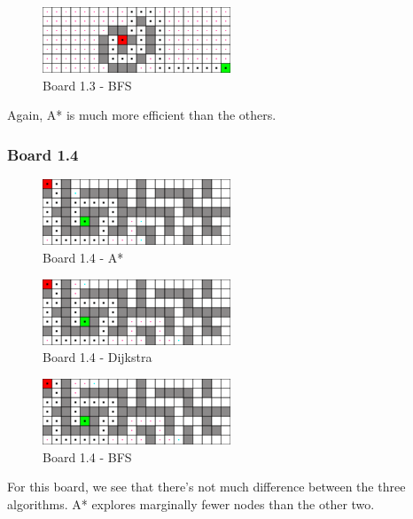 \begin{figure}[h!]
  \centering
    \includegraphics[width=0.5\textwidth]{img/board-1-3-bfs}
    \caption{Board 1.3 - BFS}
\end{figure}

Again, A* is much more efficient than the others.

\newpage

\subsubsection*{Board 1.4}

\begin{figure}[h!]
  \centering
    \includegraphics[width=0.5\textwidth]{img/board-1-4-astar}
    \caption{Board 1.4 - A*}
\end{figure}

\begin{figure}[h!]
  \centering
    \includegraphics[width=0.5\textwidth]{img/board-1-4-dijkstra}
    \caption{Board 1.4 - Dijkstra}
\end{figure}

\begin{figure}[h!]
  \centering
    \includegraphics[width=0.5\textwidth]{img/board-1-4-bfs}
    \caption{Board 1.4 - BFS}
\end{figure}

For this board, we see that there's not much difference between the three
algorithms. A* explores marginally fewer nodes than the other two.


